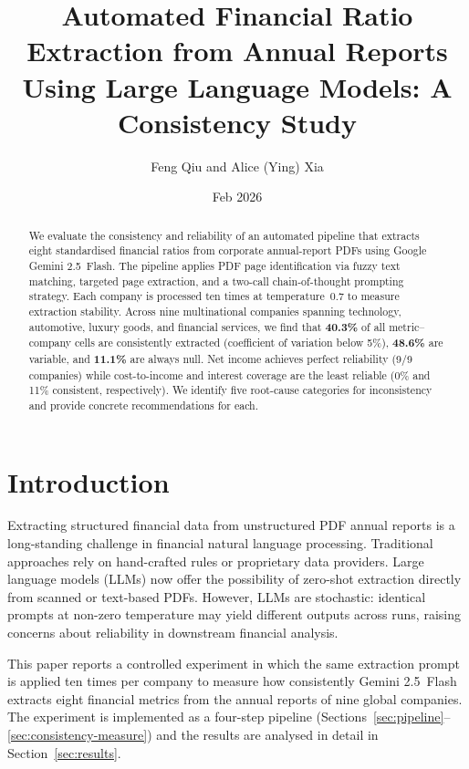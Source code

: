 \documentclass[12pt, a4paper]{article}
\title{%
  \textbf{Automated Financial Ratio Extraction from Annual Reports}\\[0.4em]
  \large Using Large Language Models: A Consistency Study
}
\author{Feng Qiu and Alice (Ying) Xia}
\date{Feb 2026}
\begin{document}
\maketitle
\thispagestyle{empty}

\begin{abstract}
\noindent
We evaluate the consistency and reliability of an automated pipeline that
extracts eight standardised financial ratios from corporate annual-report PDFs
using Google Gemini 2.5~Flash.  The pipeline applies PDF page identification
via fuzzy text matching, targeted page extraction, and a two-call
chain-of-thought prompting strategy.  Each company is processed ten times at
temperature~0.7 to measure extraction stability.  Across nine multinational
companies spanning technology, automotive, luxury goods, and financial
services, we find that \textbf{40.3\%} of all metric--company cells are
consistently extracted (coefficient of variation below 5\%), \textbf{48.6\%}
are variable, and \textbf{11.1\%} are always null.  Net income achieves
perfect reliability (9/9 companies) while cost-to-income and interest coverage
are the least reliable (0\% and 11\% consistent, respectively).  We identify
five root-cause categories for inconsistency and provide concrete
recommendations for each.
\end{abstract}

\vspace{1em}
\tableofcontents
\newpage

\section{Introduction}

Extracting structured financial data from unstructured PDF annual reports is a
long-standing challenge in financial natural language processing.  Traditional
approaches rely on hand-crafted rules or proprietary data providers.
Large language models (LLMs) now offer the possibility of zero-shot extraction
directly from scanned or text-based PDFs.  However, LLMs are stochastic:
identical prompts at non-zero temperature may yield different outputs across
runs, raising concerns about reliability in downstream financial analysis.

This paper reports a controlled experiment in which the same extraction prompt
is applied ten times per company to measure how consistently Gemini 2.5~Flash
extracts eight financial metrics from the annual reports of nine global
companies.  The experiment is implemented as a four-step pipeline
(Sections~\ref{sec:pipeline}--\ref{sec:consistency-measure}) and the results
are analysed in detail in Section~\ref{sec:results}.
\end{document}
